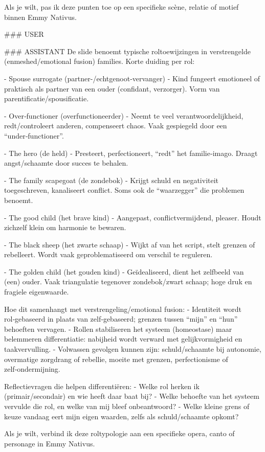 Als je wilt, pas ik deze punten toe op een specifieke scène, relatie of motief binnen Emmy Nativus.

\#\#\# USER

\#\#\# ASSISTANT
De slide benoemt typische roltoewijzingen in verstrengelde (enmeshed/emotional fusion) families. Korte duiding per rol:

- Spouse surrogate (partner-/echtgenoot‑vervanger)
- Kind fungeert emotioneel of praktisch als partner van een ouder (confidant, verzorger). Vorm van parentificatie/spousificatie.

- Over‑functioner (overfunctioneerder)
- Neemt te veel verantwoordelijkheid, redt/controleert anderen, compenseert chaos. Vaak gespiegeld door een “under‑functioner”.

- The hero (de held)
- Presteert, perfectioneert, “redt” het familie‑imago. Draagt angst/schaamte door succes te behalen.

- The family scapegoat (de zondebok)
- Krijgt schuld en negativiteit toegeschreven, kanaliseert conflict. Soms ook de “waarzegger” die problemen benoemt.

- The good child (het brave kind)
- Aangepast, conflictvermijdend, pleaser. Houdt zichzelf klein om harmonie te bewaren.

- The black sheep (het zwarte schaap)
- Wijkt af van het script, stelt grenzen of rebelleert. Wordt vaak geproblematiseerd om verschil te reguleren.

- The golden child (het gouden kind)
- Geïdealiseerd, dient het zelfbeeld van (een) ouder. Vaak triangulatie tegenover zondebok/zwart schaap; hoge druk en fragiele eigenwaarde.

Hoe dit samenhangt met verstrengeling/emotional fusion:
- Identiteit wordt rol‑gebaseerd in plaats van zelf‑gebaseerd; grenzen tussen “mijn” en “hun” behoeften vervagen.
- Rollen stabiliseren het systeem (homeostase) maar belemmeren differentiatie: nabijheid wordt verward met gelijkvormigheid en taakvervulling.
- Volwassen gevolgen kunnen zijn: schuld/schaamte bij autonomie, overmatige zorgdrang of rebellie, moeite met grenzen, perfectionisme of zelf‑ondermijning.

Reflectievragen die helpen differentiëren:
- Welke rol herken ik (primair/secondair) en wie heeft daar baat bij?
- Welke behoefte van het systeem vervulde die rol, en welke van mij bleef onbeantwoord?
- Welke kleine grens of keuze vandaag eert mijn eigen waarden, zelfs als schuld/schaamte opkomt?

Als je wilt, verbind ik deze roltypologie aan een specifieke opera, canto of personage in Emmy Nativus.

